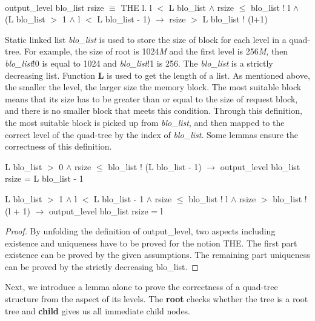 \begin{definition}  \\
	output\_level blo\_list rsize $\equiv$ THE l. l $<$ L blo\_list $\wedge$ rsize $\le$ blo\_list ! l $\wedge$ \\
	\phantom{x} \hspace{10pt} (L blo\_list $>$ 1 $\wedge$ l $<$ L blo\_list - 1) $\longrightarrow$ rsize $>$ L blo\_list ! (l+1)
\end{definition}

Static linked list \emph{blo\_list} is used to store the size of block for each level in a quad-tree. For example, the size of root is 1024\emph{M} and the first level is 256\emph{M}, then \emph{blo\_list}!0 is equal to 1024 and \emph{blo\_list}!1 is 256. The \emph{blo\_list} is a strictly decreasing list. Function \textbf{L} is used to get the length of a list. As mentioned above, the smaller the level, the larger size the memory block. The most suitable block means that its size has to be greater than or equal to the size of request block, and there is no smaller block that meets this condition. Through this definition, the most suitable block is picked up from \emph{blo\_list}, and then mapped to the correct level of the quad-tree by the index of \emph{blo\_list}. Some lemmas ensure the correctness of this definition.

\begin{lemma}
	L blo\_list $>$ 0 $\wedge$ rsize $\leq$ blo\_list ! (L blo\_list - 1) $\longrightarrow$ output\_level blo\_list rsize = L blo\_list - 1
\end{lemma}

\begin{lemma}
	L blo\_list $>$ 1 $\wedge$ l $<$ L blo\_list - 1 $\wedge$ rsize $\leq$ blo\_list ! l $\wedge$ rsize $>$ blo\_list ! (l + 1) $\longrightarrow$ output\_level blo\_list rsize = l
\end{lemma}

\begin{proof}
	By unfolding the definition of output\_level, two aspects including existence and uniqueness have to be proved for the notion THE. The first part existence can be proved by the given assumptions. The remaining part uniqueness can be proved by the strictly decreasing blo\_list.
\end{proof}

Next, we introduce a lemma alone to prove the correctness of a quad-tree structure from the aspect of its levels. The \textbf{root} checks whether the tree is a root tree and \textbf{child} gives us all immediate child nodes.

